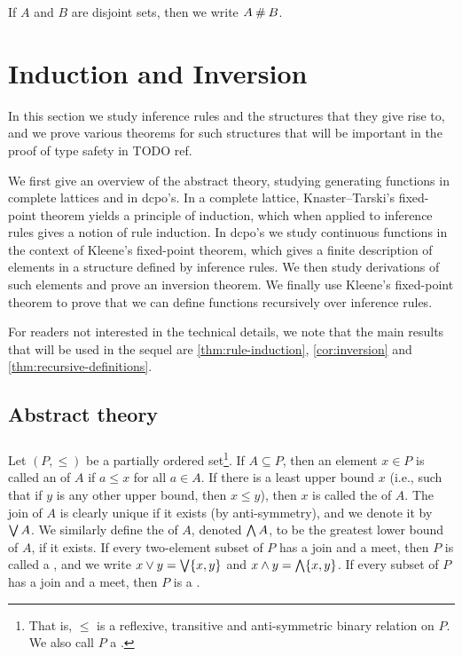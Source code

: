 \documentclass[a4paper, 11pt, article, danish, oneside]{memoir}
\newcommand{\meet}{\land}
\newcommand{\join}{\lor}
\DeclareMathOperator*{\smallbigvee}{\textstyle\bigvee}
\DeclareMathOperator*{\bigjoin}{\mathchoice
    {\smallbigvee}%
    {\bigvee}%
    {\bigvee}%
    {\bigvee}%
}
\DeclareMathOperator*{\smallbigwedge}{\textstyle\bigwedge}
\DeclareMathOperator*{\bigmeet}{\mathchoice
    {\smallbigwedge}%
    {\bigwedge}%
    {\bigwedge}%
    {\bigwedge}%
}
\newcommand{\newpar}{\paragraph{}}
\begin{document}
If $A$ and $B$ are disjoint sets, then we write $A \mathbin{\#} B$.


\chapter{Induction and Inversion}

In this section we study inference rules and the structures that they give rise to, and we prove various theorems for such structures that will be important in the proof of type safety in TODO ref.

We first give an overview of the abstract theory, studying generating functions in complete lattices and in dcpo's. In a complete lattice, Knaster--Tarski's fixed-point theorem yields a principle of induction, which when applied to inference rules gives a notion of rule induction. In dcpo's we study continuous functions in the context of Kleene's fixed-point theorem, which gives a finite description of elements in a structure defined by inference rules. We then study derivations of such elements and prove an inversion theorem. We finally use Kleene's fixed-point theorem to prove that we can define functions recursively over inference rules.

For readers not interested in the technical details, we note that the main results that will be used in the sequel are \cref{thm:rule-induction}, \cref{cor:inversion} and \cref{thm:recursive-definitions}.


\section{Abstract theory}

\newpar

Let $(P,\leq)$ be a partially ordered set\footnote{That is, $\leq$ is a reflexive, transitive and anti-symmetric binary relation on $P$. We also call $P$ a .}. If $A \subseteq P$, then an element $x \in P$ is called an  of $A$ if $a \leq x$ for all $a \in A$. If there is a least upper bound $x$ (i.e., such that if $y$ is any other upper bound, then $x \leq y$), then $x$ is called the  of $A$. The join of $A$ is clearly unique if it exists (by anti-symmetry), and we denote it by $\bigjoin A$. We similarly define the  of $A$, denoted $\bigmeet A$, to be the greatest lower bound of $A$, if it exists. If every two-element subset of $P$ has a join and a meet, then $P$ is called a , and we write $x \join y = \bigjoin \{x,y\}$ and $x \meet y = \bigmeet \{x,y\}$. If every subset of $P$ has a join and a meet, then $P$ is a .
\end{document}
